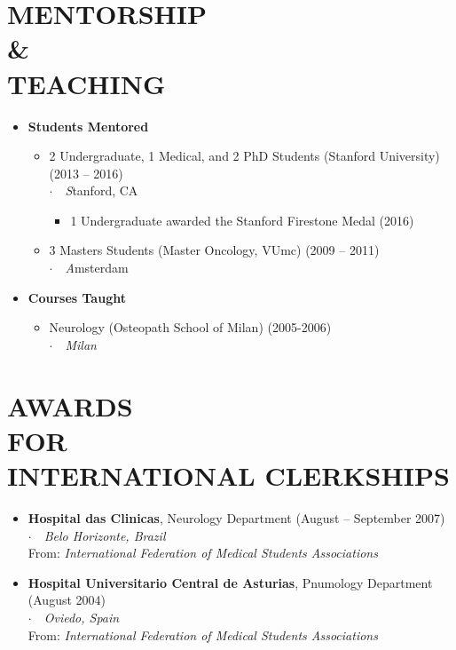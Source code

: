 \documentclass[line,margin]{res}
\newcommand{\placestyle}[1]{\footnotesize $\cdot$\ \ {\emph{#1}}}
\newcommand{\datestyle}[1]{{\tiny \dotfill} {\small (#1)}}
\begin{document}
\begin{resume}
\section{MENTORSHIP \\ \& \\ TEACHING}
\begin{itemize}
  \item {
    {\bf Students Mentored}
    \begin{itemize}
      \item 2 Undergraduate, 1 Medical, and 2 PhD Students (Stanford University) \datestyle{2013 -- 2016} \\
        {\placestyle Stanford, CA}
        \begin{itemize}
          \item 1 Undergraduate awarded the Stanford Firestone Medal \datestyle{2016}
        \end{itemize}
      \item 3 Masters Students (Master Oncology, VUmc)  \datestyle{2009 -- 2011} \\
        {\placestyle Amsterdam}
    \end{itemize}
  }
  \item {
    {\bf Courses Taught}
    \begin{itemize}
      \item Neurology (Osteopath School of Milan) \datestyle{2005-2006} \\
        {\placestyle{Milan}}
    \end{itemize}
  }

\end{itemize}

\section{AWARDS \\ FOR \\ INTERNATIONAL CLERKSHIPS}
\begin{itemize}
\item {\bf Hospital das Clinicas}, Neurology Department \datestyle{August -- September 2007} \\
  { \placestyle{Belo Horizonte, Brazil} } \\
  { \small From: \emph{International Federation of Medical Students Associations} }
\item {\bf Hospital Universitario Central de Asturias}, Pnumology Department \datestyle{August 2004} \\
  { \placestyle{Oviedo, Spain} } \\
  { \small From: \emph{International Federation of Medical Students Associations} }
\end{itemize}


\end{resume}
\end{document}
